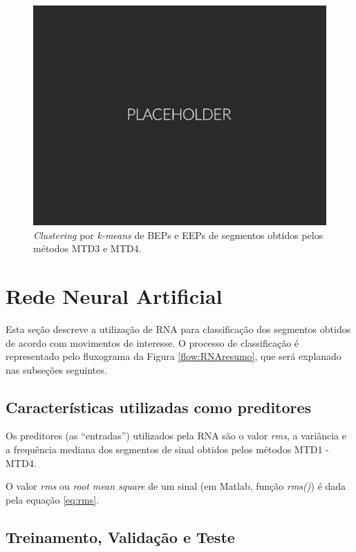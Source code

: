 \begin{figure}[htb]
	\caption{\label{fig:kmeans2}\emph{Clustering} por \emph{k-means} de BEPs e EEPs de segmentos obtidos pelos métodos MTD3 e MTD4.}
	\begin{center}
	    \includegraphics[width=0.75\linewidth]{./img/placeholder.png}
	\end{center}
\end{figure}

\section{Rede Neural Artificial}

Esta seção descreve a utilização de RNA para classificação dos segmentos obtidos de acordo com movimentos de interesse. O processo de classificação é representado pelo fluxograma da Figura \ref{flow:RNAresumo}, que será explanado nas subseções seguintes.



\subsection{Características utilizadas como preditores}

Os preditores (as ``entradas'') utilizados pela RNA são o valor \emph{rms}, a variância e a frequência mediana dos segmentos de sinal obtidos pelos métodos MTD1 - MTD4.

O valor \emph{rms} ou \emph{root mean square} de um sinal (em Matlab, função \emph{rms()}) é dada pela equação \ref{eq:rms}. 

\subsection{Treinamento, Validação e Teste}
